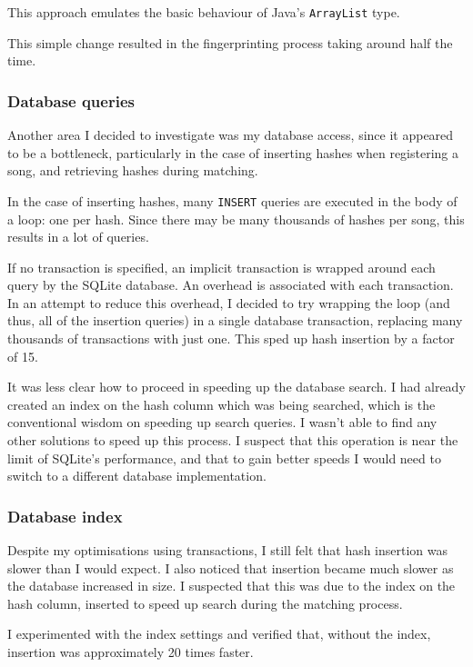 \documentclass[12pt,a4paper,twoside,openright]{report}
\begin{document}
This approach emulates the basic behaviour of Java's \lstinline{ArrayList} type.

This simple change resulted in the fingerprinting process taking around half the time.

\subsubsection{Database queries}

Another area I decided to investigate was my database access, since it appeared to be a bottleneck, particularly in the case of inserting hashes when registering a song, and retrieving hashes during matching.

In the case of inserting hashes, many \lstinline{INSERT} queries are executed in the body of a loop: one per hash. Since there may be many thousands of hashes per song, this results in a lot of queries.

If no transaction is specified, an implicit transaction is wrapped around each query by the SQLite database. An overhead is associated with each transaction. In an attempt to reduce this overhead, I decided to try wrapping the loop (and thus, all of the insertion queries) in a single database transaction, replacing many thousands of transactions with just one. This sped up hash insertion by a factor of 15.

It was less clear how to proceed in speeding up the database search. I had already created an index on the hash column which was being searched, which is the conventional wisdom on speeding up search queries. I wasn't able to find any other solutions to speed up this process. I suspect that this operation is near the limit of SQLite's performance, and that to gain better speeds I would need to switch to a different database implementation.

\subsubsection{Database index}

Despite my optimisations using transactions, I still felt that hash insertion was slower than I would expect. I also noticed that insertion became much slower as the database increased in size. I suspected that this was due to the index on the hash column, inserted to speed up search during the matching process.

I experimented with the index settings and verified that, without the index, insertion was approximately 20 times faster.
\end{document}
